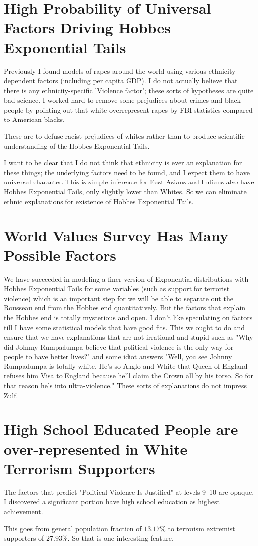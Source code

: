 \documentclass{amsart}
\begin{document}
\section{High Probability of Universal Factors Driving Hobbes Exponential Tails}

Previously I found models of rapes around the world using various ethnicity-dependent factors (including per capita GDP).  I do not actually believe that there is any ethnicity-specific 'Violence factor'; these sorts of hypotheses are quite bad science.  I worked hard to remove some prejudices about crimes and black people by pointing out that white overrepresent rapes by FBI statistics compared to American blacks.

These are to defuse racist prejudices of whites rather than to produce scientific understanding of the Hobbes Exponential Tails.  

I want to be clear that I do not think that ethnicity is ever an explanation for these things; the underlying factors need to be found, and I expect them to have universal character.  This is simple inference for East Asians and Indians also have Hobbes Exponential Tails, only slightly lower than Whites.  So we can eliminate ethnic explanations for existence of Hobbes Exponential Tails.  

\section{World Values Survey Has Many Possible Factors}

We have succeeded in modeling a finer version of Exponential distributions with Hobbes Exponential Tails for some variables (such as support for terrorist violence) which is an important step for we will be able to separate out the Rousseau end from the Hobbes end quantitatively.  But the factors that explain the Hobbes end is totally mysterious and open.  I don't like speculating on factors till I have some statistical models that have good fits.  This we ought to do and ensure that we have explanations that are not irrational and stupid such as "Why did Johnny Rumpadumpa believe that political violence is the only way for people to have better lives?"  and some idiot answers "Well, you see Johnny Rumpadumpa is totally white.  He's so Anglo and White that Queen of England refuses him Visa to England because he'll claim the Crown all by his torso.  So for that reason he's into ultra-violence."  These sorts of explanations do not impress Zulf.

\section{High School Educated People are over-represented in White Terrorism Supporters}

The factors that predict "Political Violence Is Justified" at levels 9--10 are opaque.  I discovered a significant portion  have high school education as highest achievement.

This goes from general population fraction of $13.17\%$ to terrorism extremist supporters of $27.93\%$. So that is one interesting feature.
\end{document}
